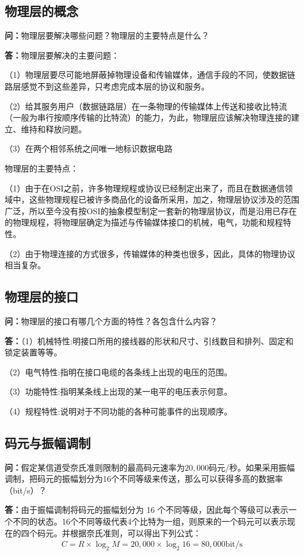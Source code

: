 \documentclass[12pt,hyperref,a4paper,UTF8]{ctexart}
\begin{document}
\subsection{物理层的概念}
\textbf{问：}物理层要解决哪些问题？物理层的主要特点是什么？

\textbf{答：}物理层要解决的主要问题：

（1）物理层要尽可能地屏蔽掉物理设备和传输媒体，通信手段的不同，使数据链路层感觉不到这些差异，只考虑完成本层的协议和服务。

（2）给其服务用户（数据链路层）在一条物理的传输媒体上传送和接收比特流（一般为串行按顺序传输的比特流）的能力，为此，物理层应该解决物理连接的建立、维持和释放问题。

（3）在两个相邻系统之间唯一地标识数据电路

物理层的主要特点：

（1）由于在OSI之前，许多物理规程或协议已经制定出来了，而且在数据通信领域中，这些物理规程已被许多商品化的设备所采用，加之，物理层协议涉及的范围广泛，所以至今没有按OSI的抽象模型制定一套新的物理层协议，而是沿用已存在的物理规程，将物理层确定为描述与传输媒体接口的机械，电气，功能和规程特性。

（2）由于物理连接的方式很多，传输媒体的种类也很多，因此，具体的物理协议相当复杂。

\subsection{物理层的接口}
\textbf{问：}物理层的接口有哪几个方面的特性？各包含什么内容？

\textbf{答：}（1）机械特性:明接口所用的接线器的形状和尺寸、引线数目和排列、固定和锁定装置等等。

（2）电气特性:指明在接口电缆的各条线上出现的电压的范围。

（3）功能特性:指明某条线上出现的某一电平的电压表示何意。

（4）规程特性:说明对于不同功能的各种可能事件的出现顺序。

\subsection{码元与振幅调制}
\textbf{问：}假定某信道受奈氏准则限制的最高码元速率为$20,000$码元/秒。如果采用振幅调制，把码元的振幅划分为16个不同等级来传送，那么可以获得多高的数据率（bit/s）？

\textbf{答：}由于振幅调制将码元的振幅划分为 16 个不同等级，因此每个等级可以表示一个不同的状态。16个不同等级代表4个比特为一组，则原来的一个码元可以表示现在的四个码元。并根据奈氏准则，可以得出下列公式：
\begin{equation}\label{eq:2.3}
\begin{aligned}
     C = R \times \log_2 M = 20,000 \times \log_2 16 = 80,000\text{{bit/s}}
\end{aligned}
\end{equation}
\end{document}
